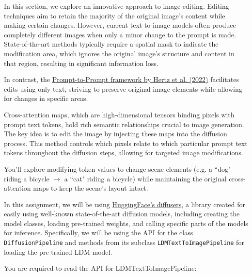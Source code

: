 \documentclass[11pt,addpoints,answers]{exam}
\begin{document}
\begin{questions}

In this section, we explore an innovative approach to image editing. Editing techniques aim to retain the majority of the original image's content while making certain changes. However, current text-to-image models often produce completely different images when only a minor change to the prompt is made. State-of-the-art methods typically require a spatial mask to indicate the modification area, which ignores the original image's structure and content in that region, resulting in significant information loss. 

In contrast, the \href{https://arxiv.org/pdf/2208.01626.pdf}{Prompt-to-Prompt framework by Hertz et al. (2022)} facilitates edits using only text, striving to preserve original image elements while allowing for changes in specific areas.

Cross-attention maps, which are high-dimensional tensors binding pixels with prompt text tokens, hold rich semantic relationships crucial to image generation. The key idea is to edit the image by injecting these maps into the diffusion process. This method controls which pixels relate to which particular prompt text tokens throughout the diffusion steps, allowing for targeted image modifications.

You'll explore modifying token values to change scene elements (e.g. a ``dog" riding a bicycle $\rightarrow$ a ``cat" riding a bicycle) while maintaining the original cross-attention maps to keep the scene's layout intact.


In this assignment, we will be using \href{https://huggingface.co/docs/diffusers/main/en/index}{HuggingFace's diffusers}, a library created for easily using well-known state-of-the-art diffusion models, including creating the model classes, loading pre-trained weights, and calling specific parts of the models for inference. Specifically, we will be using the API for the class \lstinline{DiffusionPipeline} and methods from its subclass \lstinline{LDMTextToImagePipeline} for loading the pre-trained LDM model. 

You are required to read the  API for LDMTextToImagePipeline:


\end{questions}
\end{document}
